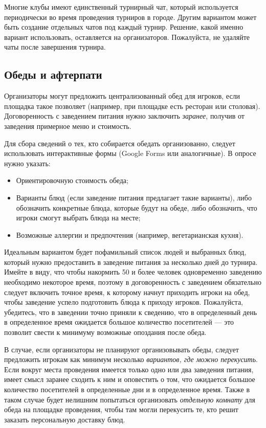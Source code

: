 Многие клубы имеют единственный турнирный чат, который используется периодически во время проведения турниров в городе. Другим вариантом может быть создание отдельных чатов под каждый турнир. Решение, какой именно вариант использовать, оставляется на организаторов. Пожалуйста, не удаляйте чаты после завершения турнира.

\subsection{Обеды и афтерпати}

Организаторы могут предложить централизованный обед для игроков, если площадка такое позволяет (например, при площадке есть ресторан или столовая). Договоренность с заведением питания нужно заключить \textit{заранее}, получив от заведения примерное меню и стоимость.

Для сбора сведений о тех, кто собирается обедать организованно, следует использовать интерактивные формы (Google Forms или аналогичные). В опросе нужно указать:
\begin{itemize}
	\item Ориентировочную стоимость обеда;
	\item Варианты блюд (если заведение питания предлагает такие варианты), либо обозначить конкретные блюда, которые будут на обеде, либо обозначить, что игроки смогут выбрать блюда на месте;
	\item Возможные аллергии и предпочтения (например, вегетарианская кухня).
\end{itemize}

Идеальным вариантом будет пофамильный список людей и выбранных блюд, который нужно предоставить в заведение питания за несколько дней до турнира. Имейте в виду, что чтобы накормить 50 и более человек одновременно заведению необходимо некоторое время, поэтому в договоренность с заведением обязательно следует включить точное время, к которому начнут приходить игроки на обед, чтобы заведение успело подготовить блюда к приходу игроков. Пожалуйста, убедитесь, что в заведении точно приняли к сведению, что в определенный день в определенное время ожидается большое количество посетителей --- это позволит свести к минимуму возможные опоздания после обеда.

В случае, если организаторы не планируют организовывать обеды, следует предложить игрокам как минимум несколько \textit{вариантов, где можно перекусить}. Если вокруг места проведения имеется только одно или два заведения питания, имеет смысл заранее сходить к ним и оповестить о том, что ожидается большое количество посетителей в определенные дни и в определенное время. Также в таком случае будет нелишним попытаться организовать \textit{отдельную комнату} для обеда на площадке проведения, чтобы там могли перекусить те, кто решит заказать персональную доставку блюд.

